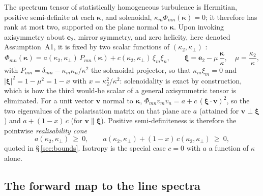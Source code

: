 \documentclass[lineno]{JFM-FLM_Au}
\begin{document}
The spectrum tensor of statistically homogeneous turbulence is Hermitian,
positive semi-definite at each $\boldsymbol{\kappa}$, and solenoidal,
$\kappa_m\Phi_{mn}(\boldsymbol{\kappa})=0$; it therefore has rank at most
two, supported on the plane normal to $\boldsymbol{\kappa}$. Upon invoking axisymmetry about $\boldsymbol{e}_2$, mirror symmetry, and zero helicity, here denoted Assumption~A1, it is fixed by two scalar functions of $(\kappa_2,\kappa_\perp)$
\citep{Batchelor1946,ChandrasekharAxisym1950,Lindborg1995}:
\begin{equation}
  \Phi_{mn}(\boldsymbol{\kappa})
  = a(\kappa_2,\kappa_\perp)\,P_{mn}(\boldsymbol{\kappa})
  + c(\kappa_2,\kappa_\perp)\,\xi_m\xi_n,
  \qquad
  \boldsymbol{\xi} = \boldsymbol{e}_2 - \mu\,
  \frac{\boldsymbol{\kappa}}{\kappa},
  \quad \mu=\frac{\kappa_2}{\kappa},
  \label{eq:twoscalar}
\end{equation}
with $P_{mn}=\delta_{mn}-\kappa_m\kappa_n/\kappa^2$ the solenoidal
projector, so that $\kappa_m\xi_m=0$ and
$|\boldsymbol{\xi}|^2=1-\mu^2=1-x$ with $x=\kappa_2^2/\kappa^2$:
solenoidality is exact by construction, which is how the third would-be
scalar of a general axisymmetric tensor is eliminated. For a unit vector
$\boldsymbol{v}$ normal to $\boldsymbol{\kappa}$,
$\Phi_{mn}v_mv_n = a + c\,(\boldsymbol{\xi}\cdot\boldsymbol{v})^2$, so the
two eigenvalues of the polarisation matrix on that plane are $a$ (attained
for $\boldsymbol{v}\perp\boldsymbol{\xi}$) and $a+(1-x)\,c$ (for
$\boldsymbol{v}\parallel\boldsymbol{\xi}$). Positive semi-definiteness is
therefore the pointwise \emph{realisability cone}
\begin{equation}
  a(\kappa_2,\kappa_\perp)\ \ge\ 0,
  \qquad
  a(\kappa_2,\kappa_\perp) + (1-x)\,c(\kappa_2,\kappa_\perp)\ \ge\ 0 ,
  \label{eq:cone}
\end{equation}
quoted in \S\,\ref{sec:bounds}. Isotropy is the special case $c=0$ with
$a$ a function of $\kappa$ alone.

\subsection{The forward map to the line spectra}\label{app:fwdmap}
\end{document}
